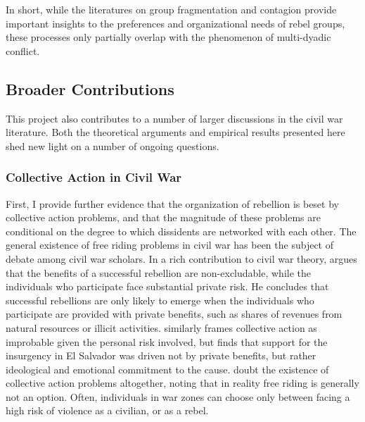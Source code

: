 
In short, while the literatures on group fragmentation and contagion provide important insights to the preferences and organizational needs of rebel groups, these processes only partially overlap with the phenomenon of multi-dyadic conflict.

\subsection{Broader Contributions}

This project also contributes to a number of larger discussions in the civil war literature. Both the theoretical arguments and empirical results presented here shed new light on a number of ongoing questions.

\subsubsection{Collective Action in Civil War}

First, I provide further evidence that the organization of rebellion is beset by collective action problems, and that the magnitude of these problems are conditional on the degree to which dissidents are networked with each other. The general existence of free riding problems in civil war has been the subject of debate among civil war scholars. In a rich contribution to civil war theory, \citet{Lichbach1995} argues that the benefits of a successful rebellion are non-excludable, while the individuals who participate face substantial private risk. He concludes that successful rebellions are only likely to emerge when the individuals who participate are provided with private benefits, such as shares of revenues from natural resources or illicit activities. \citet{Wood2003} similarly frames collective action as improbable given the personal risk involved, but finds that support for the insurgency in El Salvador was driven not by private benefits, but rather ideological and emotional commitment to the cause. \citet{Kalyvas2014} doubt the existence of collective action problems altogether, noting that in reality free riding is generally not an option. Often, individuals in war zones can choose only between facing a high risk of violence as a civilian, or as a rebel.

